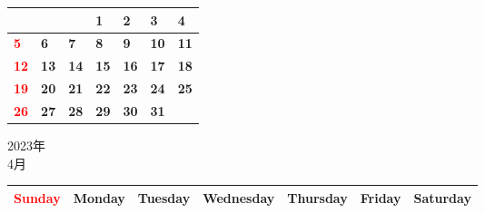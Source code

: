 \documentclass[a4paper,landscape]{jsarticle}
\newcommand{\dig}{\hspace{29mm}}
\newcommand{\tdig}{\hspace{27mm}}
\newcommand{\LBF}{\LARGE\textbf}
\begin{document}
\begingroup
\renewcommand{\arraystretch}{4}
\begin{tabular}{|p{32mm}|p{32mm}|p{32mm}|p{32mm}|p{32mm}|p{32mm}|p{32mm}|}
\hline
&&&\raisebox{30pt} {\dig\LBF{1}}&\raisebox{30pt} {\dig\LBF{2}}&\raisebox{30pt} {\dig\LBF{3}}&\raisebox{30pt} {\dig\LBF{4}}\\
\hline
\raisebox{30pt} {\dig\textcolor{red}{\LBF{5}}}&\raisebox{30pt} {\dig\LBF{6}}&\raisebox{30pt} {\dig\LBF{7}}&\raisebox{30pt} {\dig\LBF{8}}&\raisebox{30pt} {\dig\LBF{9}}&\raisebox{30pt} {\tdig\LBF{10}}&\raisebox{30pt} {\tdig\LBF{11}}\\
\hline
\raisebox{30pt} {\tdig\textcolor{red}{\LBF{12}}}&\raisebox{30pt} {\tdig\LBF{13}}&\raisebox{30pt} {\tdig\LBF{14}}&\raisebox{30pt} {\tdig\LBF{15}}&\raisebox{30pt} {\tdig\LBF{16}}&\raisebox{30pt} {\tdig\LBF{17}}&\raisebox{30pt} {\tdig\LBF{18}}\\
\hline
\raisebox{30pt} {\tdig\textcolor{red}{\LBF{19}}}&\raisebox{30pt} {\tdig\LBF{20}}&\raisebox{30pt} {\tdig\LBF{21}}&\raisebox{30pt} {\tdig\LBF{22}}&\raisebox{30pt} {\tdig\LBF{23}}&\raisebox{30pt} {\tdig\LBF{24}}&\raisebox{30pt} {\tdig\LBF{25}}\\
\hline
\raisebox{30pt} {\tdig\textcolor{red}{\LBF{26}}}&\raisebox{30pt} {\tdig\LBF{27}}&\raisebox{30pt} {\tdig\LBF{28}}&\raisebox{30pt} {\tdig\LBF{29}}&\raisebox{30pt} {\tdig\LBF{30}}&\raisebox{30pt} {\tdig\LBF{31}}&\\
\hline
\end{tabular}
\endgroup

\newpage

\begin{center}
	\LARGE 2023年\\
	\LARGE 4月
\end{center}

\begingroup
\renewcommand{\arraystretch}{1.4}
\begin{tabular}{|>{\centering\arraybackslash}p{32mm}|>{\centering\arraybackslash}p{32mm}|>{\centering\arraybackslash}p{32mm}|>{\centering\arraybackslash}p{32mm}|>{\centering\arraybackslash}p{32mm}|>{\centering\arraybackslash}p{32mm}|>{\centering\arraybackslash}p{32mm}|}
\hline
\textcolor{red}{\large Sunday}&\large Monday&\large Tuesday&\large Wednesday&\large Thursday&\large Friday&\large Saturday\\
\hline
\end{tabular}
\endgroup
\end{document}
